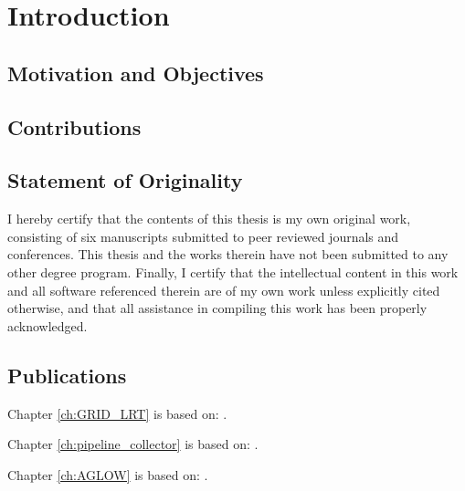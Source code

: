 \chapter{Introduction}

\section{Motivation and Objectives}





\section{Contributions}




\section{Statement of Originality}

I hereby certify that the contents of this thesis is my own original work, consisting of six manuscripts submitted to peer reviewed journals and conferences. This thesis and the works therein have not been submitted to any other degree program. Finally, I certify that the intellectual content in this work and all software referenced therein are of my own work unless explicitly cited otherwise, and that all assistance in compiling this work has been properly acknowledged.

\section{Publications}


Chapter \ref{ch:GRID_LRT} is based on:  .

Chapter \ref{ch:pipeline_collector} is based on: .

Chapter \ref{ch:AGLOW} is based on: .

